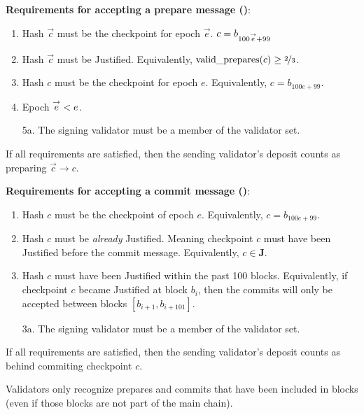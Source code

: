 \documentclass[12pt]{article}
\newcommand{\epoch}{\ensuremath{e}\xspace}
\newcommand{\hash}{\ensuremath{c}\xspace}
\newcommand{\epochsource}{\ensuremath{\overset{\to}{\epoch}}\space}
\newcommand{\hashsource}{\ensuremath{\overset{\to}{\hash}}\xspace}
\newcommand{\msgCOMMIT}{\textbf{\textsc{commit}}\xspace}
\begin{document}

\textbf{Requirements for accepting a prepare message ()}:
\begin{enumerate}
\item Hash \hashsource must be the checkpoint for epoch \epochsource.  $c = b_{100\epochsource + 99}$
\item Hash \hashsource must be Justified.  Equivalently, $\textnormal{valid\_prepares}(c) \geq \nicefrac{2}{3}$.
\item Hash \hash must be the checkpoint for epoch \epoch.  Equivalently, $\hash = b_{100\epoch + 99}$.
\item Epoch $\epochsource < \epoch$.
\item[5a.] The signing validator must be a member of the validator set.
\end{enumerate}
If all requirements are satisfied, then the sending validator's deposit counts as preparing $\hashsource \to \hash$.




\textbf{Requirements for accepting a commit message ()}:
\begin{enumerate}
\item Hash \hash must be the checkpoint of epoch \epoch.  Equivalently, $\hash = b_{100\epoch + 99}$.
\item Hash \hash must be \emph{already} Justified.  Meaning checkpoint \hash must have been Justified before the commit message.  Equivalently, $c \in \mathbf{J}$.
\item Hash \hash must have been Justified within the past 100 blocks.  Equivalently, if checkpoint \hash became Justified at block $b_i$, then the commits will only be accepted between blocks $[ b_{i+1}, b_{i+101} ]$.
\item[3a.] The signing validator must be a member of the validator set.
\end{enumerate}
If all requirements are satisfied, then the sending validator's deposit counts as behind commiting checkpoint \hash.

Validators only recognize prepares and commits that have been included in blocks (even if those blocks are not part of the main chain). 
\end{document}
